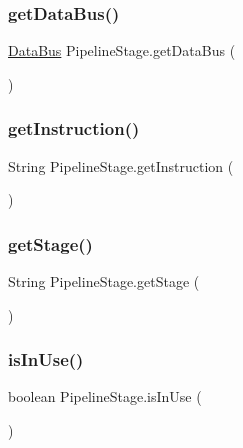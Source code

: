 \subsubsection{\texorpdfstring{get\+Data\+Bus()}{getDataBus()}}
{\footnotesize\ttfamily \mbox{\hyperlink{class_data_bus}{Data\+Bus}} Pipeline\+Stage.\+get\+Data\+Bus (\begin{DoxyParamCaption}{ }\end{DoxyParamCaption})\hspace{0.3cm}{\ttfamily [package]}}

\mbox{\label{class_pipeline_stage_a0716fd5bf42bb11790bf8ab6568dc22d}} 
\subsubsection{\texorpdfstring{get\+Instruction()}{getInstruction()}}
{\footnotesize\ttfamily String Pipeline\+Stage.\+get\+Instruction (\begin{DoxyParamCaption}{ }\end{DoxyParamCaption})\hspace{0.3cm}{\ttfamily [package]}}

\mbox{\label{class_pipeline_stage_a935e03d46a543f261995097c044fd655}} 
\subsubsection{\texorpdfstring{get\+Stage()}{getStage()}}
{\footnotesize\ttfamily String Pipeline\+Stage.\+get\+Stage (\begin{DoxyParamCaption}{ }\end{DoxyParamCaption})\hspace{0.3cm}{\ttfamily [private]}}

\mbox{\label{class_pipeline_stage_ae04dfe9641854b90cd470b1267425f0c}} 
\subsubsection{\texorpdfstring{is\+In\+Use()}{isInUse()}}
{\footnotesize\ttfamily boolean Pipeline\+Stage.\+is\+In\+Use (\begin{DoxyParamCaption}{ }\end{DoxyParamCaption})\hspace{0.3cm}{\ttfamily [package]}}

